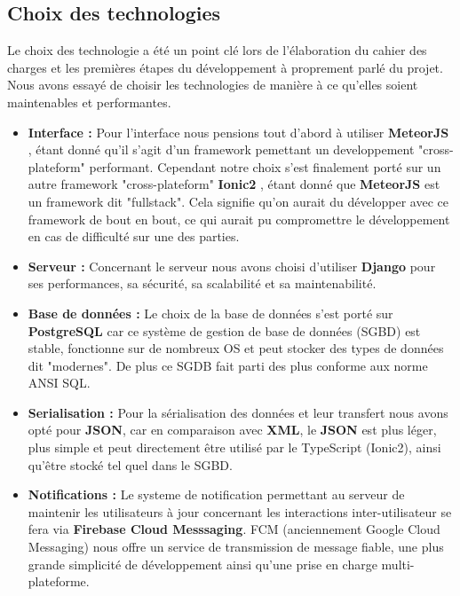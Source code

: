 \documentclass[french]{article}
\begin{document}
		\subsection{Choix des technologies}
		Le choix des technologie a été un point clé lors de l'élaboration du cahier des charges et les premières étapes du développement à proprement parlé du projet.
		Nous avons essayé de choisir les technologies de manière à ce qu'elles soient maintenables et performantes.
		\begin{itemize}
			\item \textbf{Interface :} Pour l'interface nous pensions tout d'abord à utiliser \textbf{MeteorJS} \cite{meteor}, étant donné qu'il s'agit d'un framework pemettant un developpement "cross-plateform" performant. Cependant notre choix s'est finalement porté sur un autre framework "cross-plateform" \textbf{Ionic2} \cite{ionic}, étant donné que \textbf{MeteorJS} est un framework dit "fullstack". Cela signifie qu'on aurait du développer avec ce framework de bout en bout, ce qui aurait pu compromettre le développement en cas de difficulté sur une des parties.
			\item \textbf{Serveur :} Concernant le serveur nous avons choisi d'utiliser \textbf{Django} \cite{django}  pour ses performances, sa sécurité, sa scalabilité et sa maintenabilité.
			\item \textbf{Base de données :} Le choix de la base de données s'est porté sur \textbf{PostgreSQL} car ce système de gestion de base de données (SGBD) est stable, fonctionne sur de nombreux OS et peut stocker des types de données dit "modernes". De plus ce SGDB fait parti des plus conforme aux norme ANSI SQL.
			\item \textbf{Serialisation :} Pour la sérialisation des données et leur transfert nous avons opté pour \textbf{JSON}, car en comparaison avec \textbf{XML}, le \textbf{JSON} est plus léger, plus simple et peut directement être utilisé par le TypeScript (Ionic2), ainsi qu'être stocké tel quel dans le SGBD.
			\item \textbf{Notifications :} Le systeme de notification permettant au serveur de maintenir les utilisateurs à jour concernant les interactions inter-utilisateur se fera via \textbf{Firebase Cloud Messsaging}. FCM  (anciennement Google Cloud Messaging) nous offre un service de transmission de message fiable, une plus grande simplicité de développement ainsi qu'une prise en charge multi-plateforme.
		\end{itemize}
		
\end{document}
